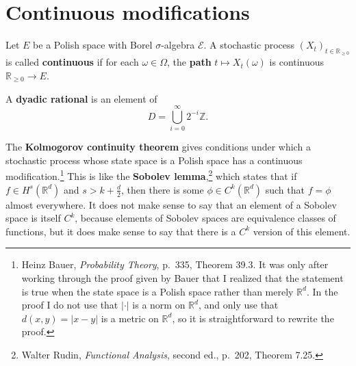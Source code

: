 \documentclass{article}
\theoremstyle{definition}
\theoremstyle{definition}
\begin{document}
\section{Continuous modifications}
Let $E$ be a Polish space with Borel $\sigma$-algebra $\mathscr{E}$. 
A stochastic process $(X_t)_{t \in \mathbb{R}_{\geq 0}}$ is called \textbf{continuous} if for each $\omega \in \Omega$, the \textbf{path}
$t \mapsto X_t(\omega)$ is continuous $\mathbb{R}_{\geq 0} \to E$. 

A \textbf{dyadic rational} is an element of
\[
D=\bigcup_{i=0}^\infty 2^{-i} \mathbb{Z}.
\]


The \textbf{Kolmogorov continuity theorem} gives conditions under which a stochastic process whose state space is a Polish space 
has a continuous modification.\footnote{Heinz
Bauer, {\em Probability Theory}, p.~335, Theorem 39.3. It was only after working through the proof given by Bauer that I realized that the statement is true when the state space is a Polish space rather than merely $\mathbb{R}^d$. In the proof I do not use that $|\cdot|$ is a norm on $\mathbb{R}^d$, and only use that $d(x,y)=|x-y|$ is a metric on $\mathbb{R}^d$,
so it is straightforward to rewrite the proof.}
This is like the \textbf{Sobolev lemma},\footnote{Walter Rudin, {\em Functional Analysis}, second ed.,
p.~202, Theorem 7.25.} which states that if
$f \in H^s(\mathbb{R}^d)$ and
$s>k+\frac{d}{2}$, then there is some $\phi \in C^k(\mathbb{R}^d)$
such that $f=\phi$ almost everywhere. It does not make sense to say that an element of a Sobolev space is itself $C^k$, because elements of
Sobolev
spaces are equivalence classes of functions, but it does make sense to say that there is a $C^k$ version of this element.
\end{document}
